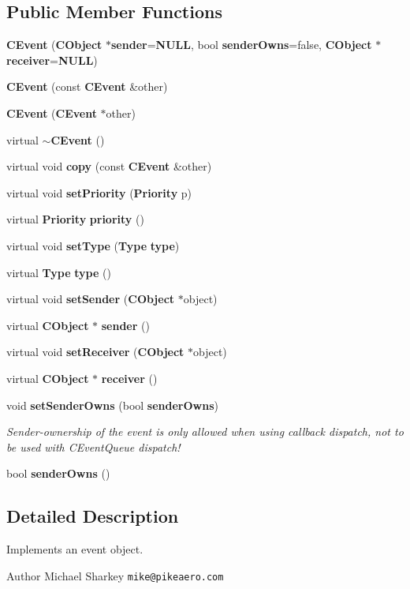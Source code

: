 \subsection*{Public Member Functions}
\begin{DoxyCompactItemize}
\item 
{\bf C\-Event} ({\bf C\-Object} $\ast${\bf sender}={\bf N\-U\-L\-L}, bool {\bf sender\-Owns}=false, {\bf C\-Object} $\ast${\bf receiver}={\bf N\-U\-L\-L})
\item 
{\bf C\-Event} (const {\bf C\-Event} \&other)
\item 
{\bf C\-Event} ({\bf C\-Event} $\ast$other)
\item 
virtual {\bf $\sim$\-C\-Event} ()
\item 
virtual void {\bf copy} (const {\bf C\-Event} \&other)
\item 
virtual void {\bf set\-Priority} ({\bf Priority} p)
\item 
virtual {\bf Priority} {\bf priority} ()
\item 
virtual void {\bf set\-Type} ({\bf Type} {\bf type})
\item 
virtual {\bf Type} {\bf type} ()
\item 
virtual void {\bf set\-Sender} ({\bf C\-Object} $\ast$object)
\item 
virtual {\bf C\-Object} $\ast$ {\bf sender} ()
\item 
virtual void {\bf set\-Receiver} ({\bf C\-Object} $\ast$object)
\item 
virtual {\bf C\-Object} $\ast$ {\bf receiver} ()
\item 
void {\bf set\-Sender\-Owns} (bool {\bf sender\-Owns})
\begin{DoxyCompactList}\small\item\em Sender-\/ownership of the event is only allowed when using callback dispatch, not to be used with C\-Event\-Queue dispatch! \end{DoxyCompactList}\item 
bool {\bf sender\-Owns} ()
\end{DoxyCompactItemize}


\subsection{Detailed Description}
Implements an event object. 

\begin{DoxyAuthor}{Author}
Michael Sharkey {\tt mike@pikeaero.\-com} 
\end{DoxyAuthor}


